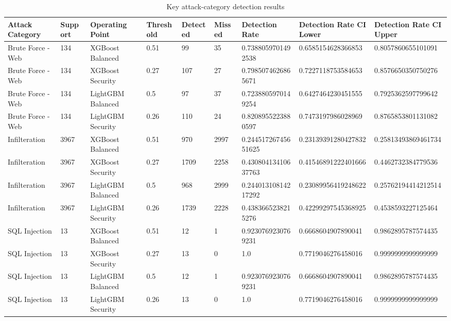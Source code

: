 \begin{table}[htbp]
\centering
\caption{Key attack-category detection results}
\begin{tabular}{lllllllll}
\hline
Attack Category & Support & Operating Point & Threshold & Detected & Missed & Detection Rate & Detection Rate CI Lower & Detection Rate CI Upper \\
\hline
Brute Force -Web & 134 & XGBoost Balanced & 0.51 & 99 & 35 & 0.7388059701492538 & 0.6585154628366853 & 0.8057860655101091 \\
Brute Force -Web & 134 & XGBoost Security & 0.27 & 107 & 27 & 0.7985074626865671 & 0.7227118753584653 & 0.8576650350750276 \\
Brute Force -Web & 134 & LightGBM Balanced & 0.5 & 97 & 37 & 0.7238805970149254 & 0.6427464230451555 & 0.7925362597799642 \\
Brute Force -Web & 134 & LightGBM Security & 0.26 & 110 & 24 & 0.8208955223880597 & 0.7473197986028969 & 0.8765853801131082 \\
Infilteration & 3967 & XGBoost Balanced & 0.51 & 970 & 2997 & 0.24451726745651625 & 0.23139391280427832 & 0.25813493869461734 \\
Infilteration & 3967 & XGBoost Security & 0.27 & 1709 & 2258 & 0.43080413410637763 & 0.41546891222401666 & 0.4462732384779536 \\
Infilteration & 3967 & LightGBM Balanced & 0.5 & 968 & 2999 & 0.24401310814217292 & 0.23089956419248622 & 0.25762194414212514 \\
Infilteration & 3967 & LightGBM Security & 0.26 & 1739 & 2228 & 0.4383665238215276 & 0.42299297545368925 & 0.4538593227125464 \\
SQL Injection & 13 & XGBoost Balanced & 0.51 & 12 & 1 & 0.9230769230769231 & 0.6668604907890041 & 0.9862895787574435 \\
SQL Injection & 13 & XGBoost Security & 0.27 & 13 & 0 & 1.0 & 0.7719046276458016 & 0.9999999999999999 \\
SQL Injection & 13 & LightGBM Balanced & 0.5 & 12 & 1 & 0.9230769230769231 & 0.6668604907890041 & 0.9862895787574435 \\
SQL Injection & 13 & LightGBM Security & 0.26 & 13 & 0 & 1.0 & 0.7719046276458016 & 0.9999999999999999 \\
\hline
\end{tabular}
\end{table}
